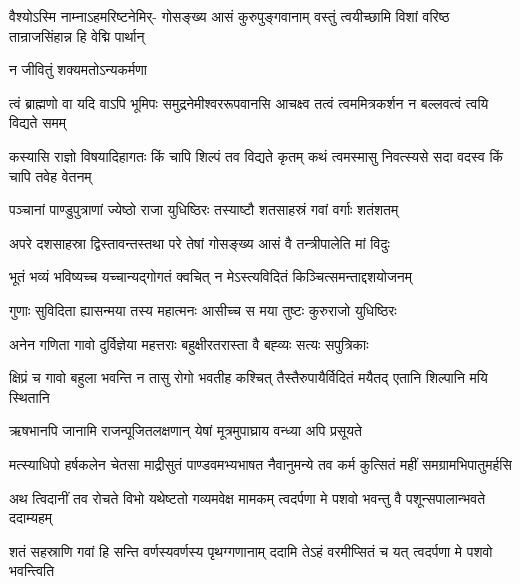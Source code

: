 \fourlineindentedshloka
{वैश्योऽस्मि नाम्नाऽहमरिष्टनेमिर्-}
{गोसङ्ख्य आसं कुरुपुङ्गवानाम्}
{वस्तुं त्वयीच्छामि विशां वरिष्ठ}
{तान्राजसिंहान्न हि वेद्मि पार्थान्}


{न जीवितुं शक्यमतोऽन्यकर्मणा\hspace{\shlokaspaceskip}}\\





\fourlineindentedshloka
{त्वं ब्राह्मणो वा यदि वाऽपि भूमिपः}
{समुद्रनेमीश्वररूपवानसि}
{आचक्ष्व तत्वं त्वममित्रकर्शन}
{न बल्लवत्वं त्वयि विद्यते समम्}


\fourlineindentedshloka
{कस्यासि राज्ञो विषयादिहागतः}
{किं चापि शिल्पं तव विद्यते कृतम्}
{कथं त्वमस्मासु निवत्स्यसे सदा}
{वदस्व किं चापि तवेह वेतनम्}




\twolineshloka
{पञ्चानां पाण्डुपुत्राणां ज्येष्ठो राजा युधिष्ठिरः}
{तस्याष्टौ शतसाहस्रं गवां वर्गाः शतंशतम्}


\twolineshloka
{अपरे दशसाहस्रा द्विस्तावन्तस्तथा परे}
{तेषां गोसङ्ख्य आसं वै तन्त्रीपालेति मां विदुः}


\twolineshloka
{भूतं भव्यं भविष्यच्च यच्चान्यद्गोगतं क्वचित्}
{न मेऽस्त्यविदितं किञ्चित्समन्ताद्दशयोजनम्}


\twolineshloka
{गुणाः सुविदिता ह्यासन्मया तस्य महात्मनः}
{आसीच्च स मया तुष्टः कुरुराजो युधिष्ठिरः}


\twolineshloka
{अनेन गणिता गावो दुर्विज्ञेया महत्तराः}
{बहुक्षीरतरास्ता वै बह्व्यः सत्यः सपुत्रिकाः}


\fourlineindentedshloka
{क्षिप्रं च गावो बहुला भवन्ति}
{न तासु रोगो भवतीह कश्चित्}
{तैस्तैरुपायैर्विदितं मयैतद्}
{एतानि शिल्पानि मयि स्थितानि}


\twolineshloka
{ऋषभानपि जानामि राजन्पूजितलक्षणान्}
{येषां मूत्रमुपाघ्राय वन्ध्या अपि प्रसूयते}



\fourlineindentedshloka
{मत्स्याधिपो हर्षकलेन चेतसा}
{माद्रीसुतं पाण्डवमभ्यभाषत}
{नैवानुमन्ये तव कर्म कुत्सितं}
{महीं समग्रामभिपातुमर्हसि}


\fourlineindentedshloka
{अथ त्विदानीं तव रोचते विभो}
{यथेष्टतो गव्यमवेक्ष मामकम्}
{त्वदर्पणा मे पशवो भवन्तु वै}
{पशून्सपालान्भवते ददाम्यहम्}


\fourlineindentedshloka
{शतं सहस्राणि गवां हि सन्ति}
{वर्णस्यवर्णस्य पृथग्गणानाम्}
{ददामि तेऽहं वरमीप्सितं च यत्}
{त्वदर्पणा मे पशवो भवन्त्विति}


